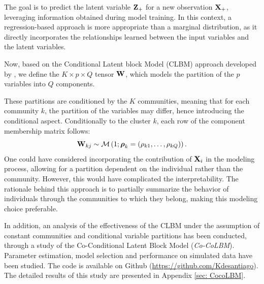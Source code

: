 The goal is to predict the latent variable \( \mathbf{Z}_+ \) for a new observation \( \mathbf{X}_+ \), leveraging information obtained during model training. In this context, a regression-based approach is more appropriate than a marginal distribution, as it directly incorporates the relationships learned between the input variables and the latent variables.

Now, based on the Conditional Latent block Model (CLBM) approach developed by \cite{goffinet2020conditional}, we define the \( K \times p \times Q \) tensor \( \mathbf{W} \), which models the partition of the \( p \) variables into \( Q \) components. 

These partitions are conditioned by the \( K \) communities, meaning that for each community \( k \), the partition of the variables may differ, hence introducing the conditional aspect.
%
Conditionally to the cluster $k$, each row of the component membership matrix follows: 
%
\begin{equation}
\label{eq: moebius_W_eq}
    \mathbf{W}_{kj} \sim \operatorname{\mathcal{M}}\left(1; \boldsymbol{\rho}_k = \left(\rho_{k1},\dots,\rho_{kQ}\right) \right).
\end{equation}
One could have considered incorporating the contribution of \( \mathbf{X}_i \) in the modeling process, allowing for a partition dependent on the individual rather than the community. However, this would have complicated the interpretability. The rationale behind this approach is to partially summarize the behavior of individuals through the communities to which they belong, making this modeling choice preferable.

In addition, an analysis of the effectiveness of the CLBM under the assumption of constant communities and conditional variable partitions has been conducted, through a study of the Co-Conditional Latent Block Model (\textit{Co-CoLBM}). Parameter estimation, model selection and performance on simulated data have been studied. The code is available on Github (\url{https://github.com/Kdesantiago}).
The detailed results of this study are presented in Appendix \ref{sec: CocoLBM}.


